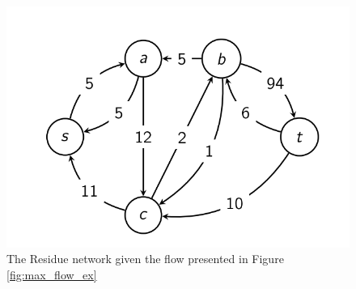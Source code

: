 \documentclass [12pt]{article}
\theoremstyle{definition}
\begin{document}
\begin{figure}[h!]
\centering
\includegraphics[scale=0.6]{max_flow_res.png}
\caption{The Residue network given the flow presented in Figure \ref{fig:max_flow_ex}}
\label{fig:max_flow_res}
\end{figure}
\end{document}
